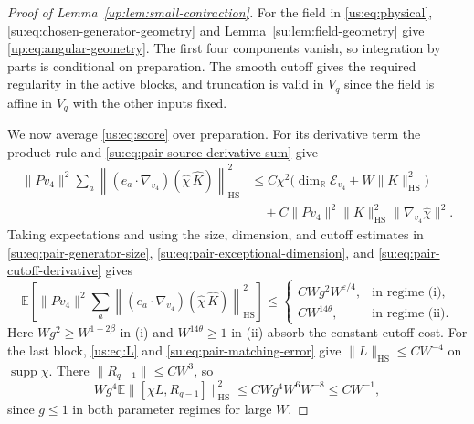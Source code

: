\documentclass[11pt]{article}
\numberwithin{equation}{section}
\theoremstyle{remark}
\newcommand{\E}{\mathbb E}
\newcommand{\R}{\mathbb R}
\newcommand{\supp}{\operatorname{supp}}
\newcommand{\HS}{\mathrm{HS}}
\begin{document}
\begin{proof}[Proof of Lemma~\ref{up:lem:small-contraction}]
For the field in \eqref{us:eq:physical}, \eqref{su:eq:chosen-generator-geometry}
and Lemma~\ref{su:lem:field-geometry} give \eqref{up:eq:angular-geometry}.
The first four components vanish, so integration by parts is conditional
on preparation. The smooth cutoff gives the required regularity in the
active blocks, and truncation is valid in $V_q$ since the field is affine
in $V_q$ with the other inputs fixed.

We now average \eqref{us:eq:score} over preparation. For its derivative
term the product rule and \eqref{su:eq:pair-source-derivative-sum} give
\begin{equation}\label{su:eq:chosen-generator-cut-costs}
 \begin{aligned}
 \|Pv_4\|^2\sum_a
 \left\|(e_a\cdot\nabla_{v_4})(\widehat\chi\,\widehat K)\right\|_{\HS}^2
 &\le C\chi^2\bigl(\dim_{\R}\mathcal E_{v_4}+W\|K\|_{\HS}^2\bigr)\\
 &\quad+C\|Pv_4\|^2\|K\|_{\HS}^2
                    \|\nabla_{v_4}\widehat\chi\|^2.
 \end{aligned}
\end{equation}
Taking expectations and using the size, dimension, and cutoff estimates
in \eqref{su:eq:pair-generator-size}, \eqref{su:eq:pair-exceptional-dimension},
and \eqref{su:eq:pair-cutoff-derivative} gives
\begin{equation}\label{su:eq:pair-source-energy}
 \E\left[\|Pv_4\|^2\sum_a
       \left\|(e_a\cdot\nabla_{v_4})(\widehat\chi\,\widehat K)\right\|_{\HS}^2\right]\le
 \begin{cases}
 CWg^2W^{\varepsilon/4},&\text{in regime (i)},\\
 CW^{14\theta},&\text{in regime (ii)}.
 \end{cases}
\end{equation}
Here $Wg^2\ge W^{1-2\beta}$ in (i) and $W^{14\theta}\ge1$ in (ii)
absorb the constant cutoff cost. For the last block, \eqref{us:eq:L}
and \eqref{su:eq:pair-matching-error} give $\|L\|_{\HS}\le CW^{-4}$
on $\supp\chi$. There $\|R_{q-1}\|\le CW^3$, so
\[
 Wg^4\E\|[\chi L,R_{q-1}]\|_{\HS}^2
 \le CWg^4W^6W^{-8}\le CW^{-1},
\]
since $g\le1$ in both parameter regimes for large $W$.


\end{proof}
\end{document}
